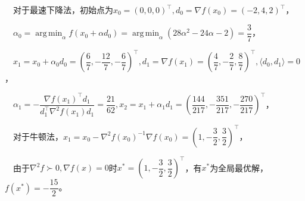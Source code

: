 \documentclass[cn,hazy,green,11pt,normal]{elegantnote}
\DeclareMathOperator*{\argmin}{arg\,min}
\begin{document}
    $\quad$对于最速下降法，初始点为$x_0=(0,0,0)^{\top},d_0=\nabla f(x_0)=(-2,4,2)^{\top}$，

    $\quad \alpha_0=\argmin_{\alpha}f(x_0+\alpha d_0)=\argmin_{\alpha}(28\alpha^2-24\alpha-2)=\dfrac37$，

    $\quad x_1=x_0+\alpha_0 d_0=\left(\dfrac67,-\dfrac{12}7,-\dfrac67\right)^{\top},d_1=\nabla f(x_1)=\left(\dfrac47,-\dfrac27,\dfrac87\right)^{\top},\langle d_0,d_1\rangle=0$，

    $\quad \alpha_1=-\dfrac{\nabla f(x_1)^{\top}d_1}{d_1^{\top}\nabla^2 f(x_1)d_1}=\dfrac{21}{62},x_2=x_1+\alpha_1 d_1=\left(\dfrac{144}{217},-\dfrac{351}{217},-\dfrac{270}{217}\right)^{\top}$，

    $\quad$对于牛顿法，$x_1=x_0-\nabla^2 f(x_0)^{-1}\nabla f(x_0)=\left(1,-\dfrac32,\dfrac32\right)^{\top}$，

    $\quad$由于$\nabla^2 f\succ 0,\nabla f(x)=0$时$x^*=\left(1,-\dfrac32,\dfrac32\right)^{\top}$，有$x^*$为全局最优解，$f(x^*)=-\dfrac{15}2$。
\end{document}
